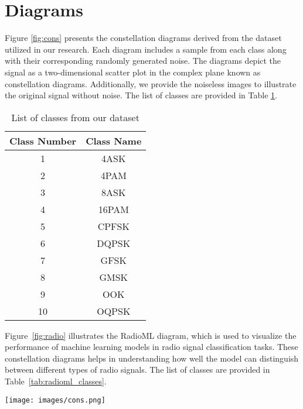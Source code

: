 \section{Diagrams}

Figure \ref{fig:cons} presents the constellation diagrams derived from the dataset utilized in our research. Each diagram includes a sample from each class along with their corresponding randomly generated noise. The diagrams depict the signal as a two-dimensional scatter plot in the complex plane known as constellation diagrams. Additionally, we provide the noiseless images to illustrate the original signal without noise. The list of classes are provided in Table \ref{tab:cons_classes}.

\begin{table}[h]
    \centering
    \caption{List of classes from our dataset}
    \label{tab:cons_classes}
    \begin{tabular}{|c|c|}
        \hline
        Class Number & Class Name \\ \hline
        1 & 4ASK \\ \hline
        2 & 4PAM \\ \hline
        3 & 8ASK \\ \hline
        4 & 16PAM \\ \hline
        5 & CPFSK \\ \hline
        6 & DQPSK \\ \hline
        7 & GFSK \\ \hline
        8 & GMSK \\ \hline
        9 & OOK \\ \hline
        10 & OQPSK \\ \hline
    \end{tabular}
\end{table}

Figure~\ref{fig:radio} illustrates the RadioML diagram, which is used to visualize the performance of machine learning models in radio signal classification tasks. These constellation diagrams helps in understanding how well the model can distinguish between different types of radio signals. The list of classes are provided in Table~\ref{tab:radioml_classes}.

\begin{figure*}[hbp]
    \centering
    \texttt{[image: images/cons.png]}
    \caption{constellation diagram}
    \label{fig:cons}
\end{figure*}


